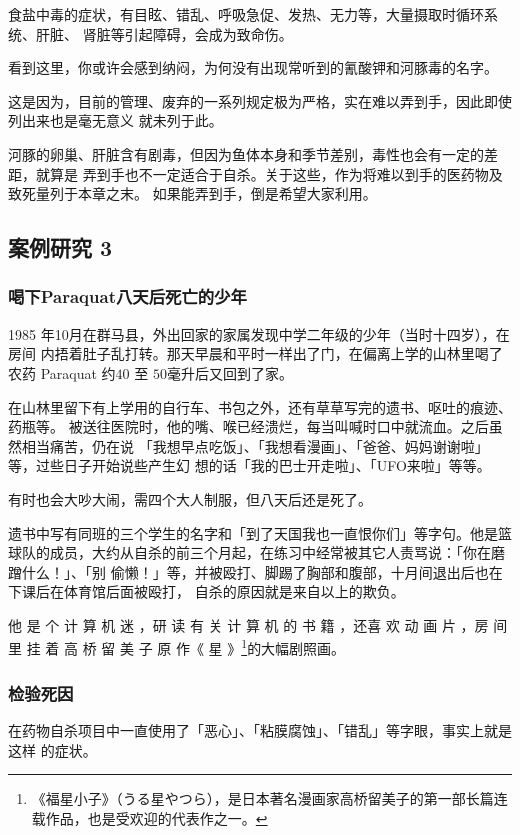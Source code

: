 \documentclass[UTF8]{ctexart}
\begin{document}
食盐中毒的症状，有目眩、错乱、呼吸急促、发热、无力等，大量摄取时循环系统、肝脏、
肾脏等引起障碍，会成为致命伤。

看到这里，你或许会感到纳闷，为何没有出现常听到的氰酸钾和河豚毒的名字。

这是因为，目前的管理、废弃的一系列规定极为严格，实在难以弄到手，因此即使列出来也是毫无意义
就未列于此。

河豚的卵巢、肝脏含有剧毒，但因为鱼体本身和季节差别，毒性也会有一定的差距，就算是 弄到手也不一定适合于自杀。关于这些，作为将难以到手的医药物及致死量列于本章之末。 如果能弄到手，倒是希望大家利用。

\subsection{案例研究 3}
\subsubsection*{喝下Paraquat八天后死亡的少年}

1985 年10月在群马县，外出回家的家属发现中学二年级的少年（当时十四岁），在房间
内捂着肚子乱打转。那天早晨和平时一样出了门，在偏离上学的山林里喝了农药
Paraquat 约$40$ 至 $50$毫升后又回到了家。

在山林里留下有上学用的自行车、书包之外，还有草草写完的遗书、呕吐的痕迹、药瓶等。
被送往医院时，他的嘴、喉已经溃烂，每当叫喊时口中就流血。之后虽然相当痛苦，仍在说
「我想早点吃饭」、「我想看漫画」、「爸爸、妈妈谢谢啦」等，过些日子开始说些产生幻
想的话「我的巴士开走啦」、「UFO来啦」等等。

有时也会大吵大闹，需四个大人制服，但八天后还是死了。

遗书中写有同班的三个学生的名字和「到了天国我也一直恨你们」等字句。他是篮球队的成员，大约从自杀的前三个月起，在练习中经常被其它人责骂说：「你在磨蹭什么！」、「别 偷懒！」等，并被殴打、脚踢了胸部和腹部，十月间退出后也在下课后在体育馆后面被殴打， 自杀的原因就是来自以上的欺负。

他 是 个 计 算 机 迷 ，研 读 有 关 计 算 机 的 书 籍 ，还喜 欢 动 画 片 ，房 间 里 挂 着 高 桥 留 美 子 原 作《 星 》\footnote{《福星小子》（うる星やつら），是日本著名漫画家高桥留美子的第一部长篇连载作品，也是受欢迎的代表作之一。}的大幅剧照画。

\subsubsection*{检验死因}

在药物自杀项目中一直使用了「恶心」、「粘膜腐蚀」、「错乱」等字眼，事实上就是这样
的症状。
\end{document}
